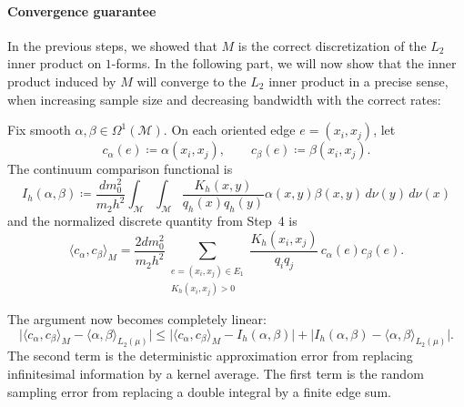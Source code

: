 \documentclass[a4paper,11pt, DIV=10]{scrartcl}
\numberwithin{equation}{section}
\theoremstyle{definition}
\theoremstyle{remark}
\newcommand{\mc}[1]{\mathcal{#1}}
\begin{document}
\paragraph{Convergence guarantee}
In the previous steps, we showed that $M$ is the correct discretization of the $L_2$ inner product on $1$-forms. In the following part, we will now show that the inner product induced by $M$ will converge to the $L_2$ inner product in a precise sense, when increasing sample size and decreasing bandwidth with the correct rates:

Fix smooth $\alpha,\beta\in \Omega^1(\mc{M})$. On each oriented edge $e=(x_i,x_j)$, let
\begin{equation}
\label{eq:def-sampled-cochains}
c_\alpha(e)\coloneq \alpha(x_i,x_j),
\qquad
c_\beta(e)\coloneq \beta(x_i,x_j).
\end{equation}
The continuum comparison functional is
\begin{equation}
I_h(\alpha,\beta)
\coloneq
\frac{dm_0^2}{m_2h^2}
\int_{\mc{M}}\int_{\mc{M}}
\frac{K_h(x,y)}{q_h(x)q_h(y)}
\alpha(x,y)\beta(x,y)\,d\nu(y)\,d\nu(x)
\end{equation}
and the normalized discrete quantity from Step~4 is
\begin{equation}
\label{eq:discrete-inner-product-expanded}
\langle c_\alpha,c_\beta\rangle_M
=
\frac{2dm_0^2}{m_2h^2}
\sum_{\substack{e=(x_i,x_j)\in E_1\\ K_h(x_i,x_j)>0}}
\frac{K_h(x_i,x_j)}{q_iq_j}\,c_\alpha(e)c_\beta(e).
\end{equation}

The argument now becomes completely linear:
\begin{equation}
\label{eq:error-decomposition}
\bigl|\langle c_\alpha,c_\beta\rangle_M-\langle \alpha,\beta\rangle_{L_2(\mu)}\bigr|
\le
\bigl|\langle c_\alpha,c_\beta\rangle_M-I_h(\alpha,\beta)\bigr|
+
\bigl|I_h(\alpha,\beta)-\langle \alpha,\beta\rangle_{L_2(\mu)}\bigr|.
\end{equation}
The second term is the deterministic approximation error from replacing infinitesimal information by a kernel average. The first term is the random sampling error from replacing a double integral by a finite edge sum.
\end{document}
